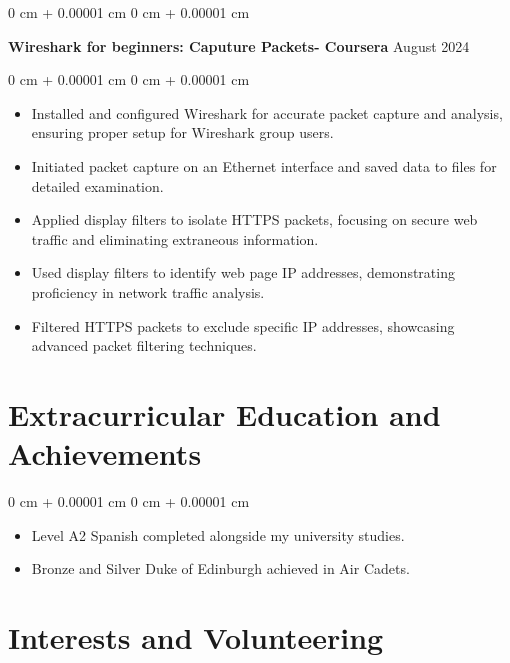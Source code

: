 \documentclass[10pt, letterpaper]{article}
\newenvironment{highlights}{
    \begin{itemize}[
        topsep=0.10 cm,
        parsep=0.10 cm,
        partopsep=0pt,
        itemsep=0pt,
        leftmargin=0 cm + 10pt
    ]
}{
    \end{itemize}
} %
\newenvironment{onecolentry}{
    \begin{adjustwidth}{
        0 cm + 0.00001 cm
    }{
        0 cm + 0.00001 cm
    }
}{
    \end{adjustwidth}
} %
\newenvironment{twocolentry}[2][]{
    \onecolentry
    \def\secondColumn{#2}
    \setcolumnwidth{\fill, 4.5 cm}
    \begin{paracol}{2}
}{
    \switchcolumn \raggedleft \secondColumn
    \end{paracol}
    \endonecolentry
} %
\begin{document}
        

        \begin{twocolentry}{
            August 2024
        }
            \textbf{Wireshark for beginners: Caputure Packets- Coursera}\end{twocolentry}

        \vspace{0.05 cm}
        \begin{onecolentry}
            \begin{highlights}
                \item Installed and configured Wireshark for accurate packet capture and analysis, ensuring proper setup for Wireshark group users.
                \item Initiated packet capture on an Ethernet interface and saved data to files for detailed examination.
                \item Applied display filters to isolate HTTPS packets, focusing on secure web traffic and eliminating extraneous information.
                \item Used display filters to identify web page IP addresses, demonstrating proficiency in network traffic analysis.
                \item Filtered HTTPS packets to exclude specific IP addresses, showcasing advanced packet filtering techniques.
            \end{highlights}
        \end{onecolentry}

\section {Extracurricular Education and Achievements} 
    \begin{onecolentry}
        \begin{highlights}
            \item Level A2 Spanish completed alongside my university studies.
            \item Bronze and Silver Duke of Edinburgh achieved in Air Cadets.

        \end{highlights}
    \end{onecolentry}

   

 \section{Interests and Volunteering}
        
\end{document}
